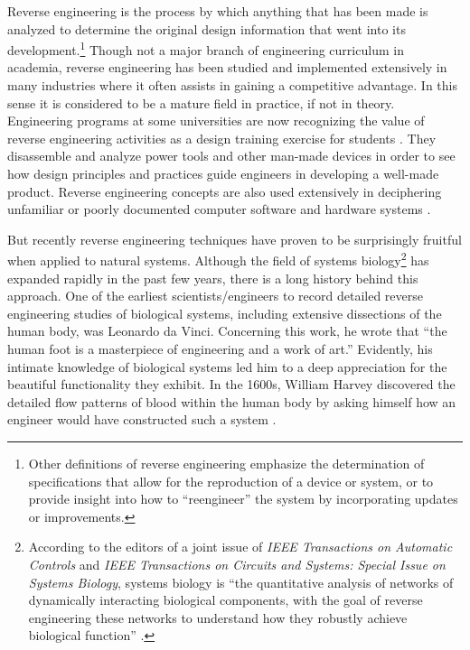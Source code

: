 Reverse engineering is the process by which anything that has been made
is analyzed to determine the original design information that went into
its development.\footnote{%
Other definitions of reverse engineering emphasize
the determination of specifications that allow for the reproduction of
a device or system, or to provide insight into how to “reengineer” the
system by incorporating updates or improvements.
} Though not a major branch of
engineering curriculum in academia, reverse engineering has been
studied and implemented extensively in many industries where it often
assists in gaining a competitive advantage. In this sense it is
considered to be a mature field in practice, if not in theory.
Engineering programs at some universities are now recognizing the value
of reverse engineering activities as a design training exercise for
students \citep[][pp. 57--59]{wu2008}.
They disassemble and analyze power tools
and other man-made devices in order to see how design principles and
practices guide engineers in developing a well-made product. Reverse
engineering concepts are also used extensively in deciphering
unfamiliar or poorly documented computer software and hardware
systems \citep{eilam2005}.

But recently reverse engineering techniques have proven to be
surprisingly fruitful when applied to natural systems. Although the
field of systems biology\footnote{%
According to the editors of a joint issue of
\textit{IEEE Transactions on Automatic Controls} and \textit{IEEE
Transactions on Circuits and Systems: Special Issue on Systems Biology}, 
systems biology is “the quantitative analysis of
networks of dynamically interacting biological components, with the
goal of reverse engineering these networks to understand how they
robustly achieve biological function” .
} has expanded rapidly in
the past few years, there is a long history behind this approach. One
of the earliest scientists/engineers to record detailed reverse
engineering studies of biological systems, including extensive
dissections of the human body, was Leonardo da Vinci. Concerning this
work, he wrote that “the human foot is a masterpiece of engineering and
a work of art.” Evidently, his intimate knowledge of biological systems
led him to a deep appreciation for the beautiful functionality they
exhibit. In the 1600s, William Harvey discovered the detailed flow
patterns of blood within the human body by asking himself how an
engineer would have constructed such a system \citep{auffraynoble2009}.

